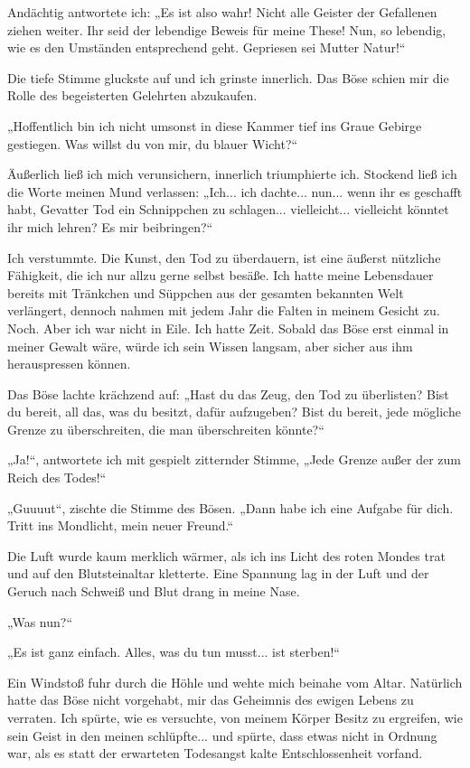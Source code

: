 \documentclass[10pt, a4paper, oneside]{book}
\begin{document}
Andächtig antwortete ich: „Es ist also wahr! Nicht alle Geister der Gefallenen ziehen weiter. Ihr seid der lebendige Beweis für meine These! Nun, so lebendig, wie es den Umständen entsprechend geht. Gepriesen sei Mutter Natur!“

Die tiefe Stimme gluckste auf und ich grinste innerlich. Das Böse schien mir die Rolle des begeisterten Gelehrten abzukaufen.

„Hoffentlich bin ich nicht umsonst in diese Kammer tief ins Graue Gebirge gestiegen. Was willst du von mir, du blauer Wicht?“

Äußerlich ließ ich mich verunsichern, innerlich triumphierte ich. Stockend ließ ich die Worte meinen Mund verlassen: „Ich... ich dachte... nun... wenn ihr es geschafft habt, Gevatter Tod ein Schnippchen zu schlagen... vielleicht... vielleicht könntet ihr mich lehren? Es mir beibringen?“

Ich verstummte. Die Kunst, den Tod zu überdauern, ist eine äußerst nützliche Fähigkeit, die ich nur allzu gerne selbst besäße. Ich hatte meine Lebensdauer bereits mit Tränkchen und Süppchen aus der gesamten bekannten Welt verlängert, dennoch nahmen mit jedem Jahr die Falten in meinem Gesicht zu. Noch. Aber ich war nicht in Eile. Ich hatte Zeit. Sobald das Böse erst einmal in meiner Gewalt wäre, würde ich sein Wissen langsam, aber sicher aus ihm herauspressen können.

Das Böse lachte krächzend auf: „Hast du das Zeug, den Tod zu überlisten? Bist du bereit, all das, was du besitzt, dafür aufzugeben? Bist du bereit, jede mögliche Grenze zu überschreiten, die man überschreiten könnte?“

„Ja!“, antwortete ich mit gespielt zitternder Stimme, „Jede Grenze außer der zum Reich des Todes!“

„Guuuut“, zischte die Stimme des Bösen. „Dann habe ich eine Aufgabe für dich. Tritt ins Mondlicht, mein neuer Freund.“

Die Luft wurde kaum merklich wärmer, als ich ins Licht des roten Mondes trat und auf den Blutsteinaltar kletterte. Eine Spannung lag in der Luft und der Geruch nach Schweiß und Blut drang in meine Nase.

„Was nun?“

„Es ist ganz einfach. Alles, was du tun musst... ist sterben!“

Ein Windstoß fuhr durch die Höhle und wehte mich beinahe vom Altar. Natürlich hatte das Böse nicht vorgehabt, mir das Geheimnis des ewigen Lebens zu verraten. Ich spürte, wie es versuchte, von meinem Körper Besitz zu ergreifen, wie sein Geist in den meinen schlüpfte... und spürte, dass etwas nicht in Ordnung war, als es statt der erwarteten Todesangst kalte Entschlossenheit vorfand.
\end{document}
